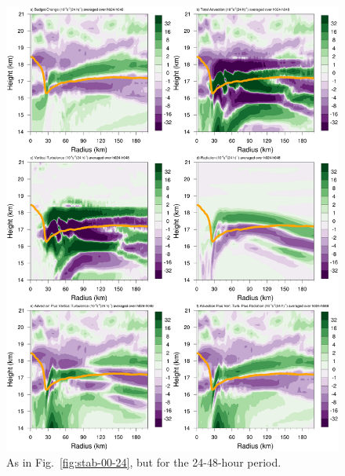 \documentclass{ametsoc}
\begin{document}
\begin{figure}[ht]
\centerline{\includegraphics[width=39pc]{figures/h024-h048-budgetterms.png}}
\caption{As in Fig.~\ref{fig:stab-00-24}, but for the 24-48-hour period.}
\label{fig:stab-24-48}
\end{figure}
\end{document}
